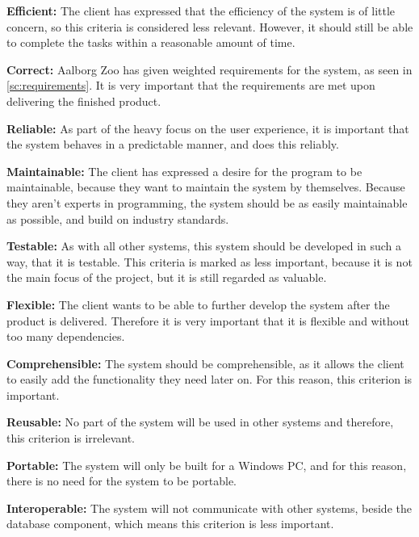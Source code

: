 \textbf{Efficient:} The client has expressed that the efficiency of the system is of little concern, so this criteria is considered less relevant. However, it should still be able to complete the tasks within a reasonable amount of time.

\textbf{Correct:} Aalborg Zoo has given weighted requirements for the system, as seen in \autoref{sc:requirements}. It is very important that the requirements are met upon delivering the finished product. 

\textbf{Reliable:} As part of the heavy focus on the user experience, it is important that the system behaves in a predictable manner, and does this reliably.

\textbf{Maintainable:}
The client has expressed a desire for the program to be maintainable, because they want to maintain the system by themselves. Because they aren't experts in programming, the system should be as easily maintainable as possible, and build on industry standards.

\textbf{Testable:}
As with all other systems, this system should be developed in such a way, that it is testable. This criteria is marked as less important, because it is not the main focus of the project, but it is still regarded as valuable.

\textbf{Flexible:}
The client wants to be able to further develop the system after the product is delivered. Therefore it is very important that it is flexible and without too many dependencies.

\textbf{Comprehensible:}
The system should be comprehensible, as it allows the client to easily add the functionality they need later on. For this reason, this criterion is important.

\textbf{Reusable:}
No part of the system will be used in other systems and therefore, this criterion is irrelevant.

\textbf{Portable:}
The system will only be built for a Windows PC, and for this reason, there is no need for the system to be portable. 

\textbf{Interoperable:}
The system will not communicate with other systems, beside the database component, which means this criterion is less important.